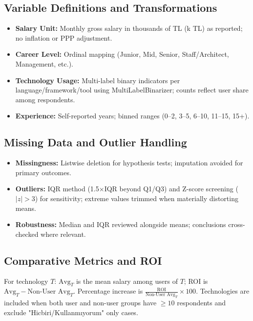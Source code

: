 \documentclass[12pt,a4paper]{article}
\begin{document}
\subsection{Variable Definitions and Transformations}
\begin{itemize}
    \item \textbf{Salary Unit:} Monthly gross salary in thousands of TL (k TL) as reported; no inflation or PPP adjustment.
    \item \textbf{Career Level:} Ordinal mapping (Junior, Mid, Senior, Staff/Architect, Management, etc.).
    \item \textbf{Technology Usage:} Multi-label binary indicators per language/framework/tool using MultiLabelBinarizer; counts reflect user share among respondents.
    \item \textbf{Experience:} Self-reported years; binned ranges (0--2, 3--5, 6--10, 11--15, 15+).
\end{itemize}

\subsection{Missing Data and Outlier Handling}
\begin{itemize}
    \item \textbf{Missingness:} Listwise deletion for hypothesis tests; imputation avoided for primary outcomes.
    \item \textbf{Outliers:} IQR method (1.5\(\times\)IQR beyond Q1/Q3) and Z-score screening (\(|z|>3\)) for sensitivity; extreme values trimmed when materially distorting means.
    \item \textbf{Robustness:} Median and IQR reviewed alongside means; conclusions cross-checked where relevant.
\end{itemize}

\subsection{Comparative Metrics and ROI}
For technology \(T\): \(\text{Avg}_T\) is the mean salary among users of \(T\); ROI is \(\text{Avg}_T - \text{Non-User Avg}_T\). Percentage increase is \(\frac{\text{ROI}}{\text{Non-User Avg}_T}\times 100\). Technologies are included when both user and non-user groups have \(\geq 10\) respondents and exclude "Hicbiri/Kullanmıyorum" only cases.
\end{document}
